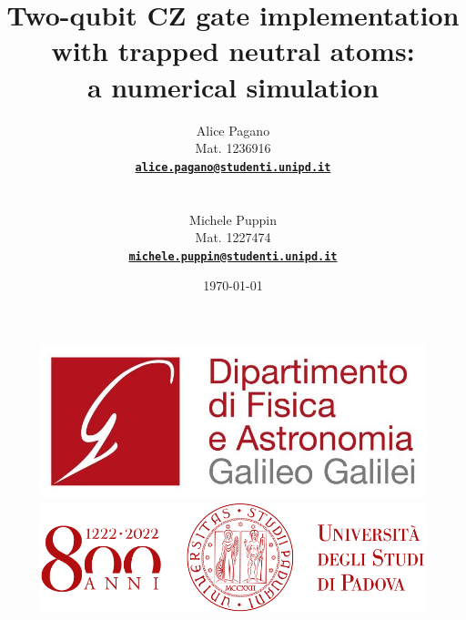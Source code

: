 \documentclass[rmp,10pt,onecolumn,fleqn,notitlepage]{revtex4-1}
\begin{document}

\begin{figure}[H]
\begin{minipage}{0.25\linewidth}
\includegraphics[width=\linewidth]{image/logo/logo_DFA.jpg}
\end{minipage}
\hfill
\begin{minipage}{0.35\linewidth}
\includegraphics[width=\textwidth]{image/logo/logo_800anni.png}
\end{minipage}
\end{figure}

\noindent\makebox[\linewidth]{\color{linescolor} \rule{0.85\paperwidth}{1.2 pt}}
\noindent\makebox[\linewidth]{\color{linescolor} \rule[0.3cm]{0.85\paperwidth}{1pt}}

\title{Two-qubit CZ gate implementation with trapped neutral atoms: \\ a numerical simulation}
\author{
    \parbox{3.0cm}{Alice Pagano}       \parbox{2.5cm}{Mat. 1236916} \parbox{6.0cm}{\bf\href{mailto:alice.pagano@studenti.unipd.it}{\texttt{alice.pagano@studenti.unipd.it}}}          \\
    \parbox{3.0cm}{Michele Puppin} \parbox{2.5cm}{Mat. 1227474} \parbox{6.0cm}{\bf\href{mailto:michele.puppin@studenti.unipd.it}{\texttt{michele.puppin@studenti.unipd.it}}}}
\date{\today}
\end{document}
